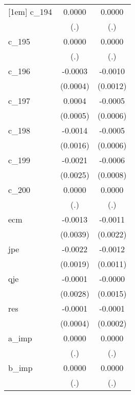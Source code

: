 {\begin{tabular}{l*{2}{c}}
[1em]
c\_194       &      0.0000        &      0.0000        \\
            &         (.)        &         (.)        \\
[1em]
c\_195       &      0.0000        &      0.0000        \\
            &         (.)        &         (.)        \\
[1em]
c\_196       &     -0.0003        &     -0.0010        \\
            &    (0.0004)        &    (0.0012)        \\
[1em]
c\_197       &      0.0004        &     -0.0005        \\
            &    (0.0005)        &    (0.0006)        \\
[1em]
c\_198       &     -0.0014        &     -0.0005        \\
            &    (0.0016)        &    (0.0006)        \\
[1em]
c\_199       &     -0.0021        &     -0.0006        \\
            &    (0.0025)        &    (0.0008)        \\
[1em]
c\_200       &      0.0000        &      0.0000        \\
            &         (.)        &         (.)        \\
[1em]
ecm         &     -0.0013        &     -0.0011        \\
            &    (0.0039)        &    (0.0022)        \\
[1em]
jpe         &     -0.0022        &     -0.0012        \\
            &    (0.0019)        &    (0.0011)        \\
[1em]
qje         &     -0.0001        &     -0.0000        \\
            &    (0.0028)        &    (0.0015)        \\
[1em]
res         &     -0.0001        &     -0.0001        \\
            &    (0.0004)        &    (0.0002)        \\
[1em]
a\_imp       &      0.0000        &      0.0000        \\
            &         (.)        &         (.)        \\
[1em]
b\_imp       &      0.0000        &      0.0000        \\
            &         (.)        &         (.)        \\

\end{tabular}}
